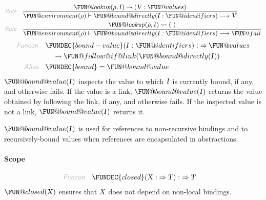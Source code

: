 \begin{align*}
  \KEY{Rule} \quad
    & \frac{
      \FUN@lookup
        (  \VAR{\ensuremath{\rho}}, 
               \VAR{I} ) \leadsto 
        (  \VAR{V} : \FUN@values )
      }{
      \FUN@environment (  \VAR{\ensuremath{\rho}} ) \vdash \FUN@bound@directly
                    (  \VAR{I} : \FUN@identifiers ) \TRANS 
        \VAR{V}
      }
\\
  \KEY{Rule} \quad
    & \frac{
      \FUN@lookup
        (  \VAR{\ensuremath{\rho}}, 
               \VAR{I} ) \leadsto 
        (   \  )
      }{
      \FUN@environment (  \VAR{\ensuremath{\rho}} ) \vdash \FUN@bound@directly
                    (  \VAR{I} : \FUN@identifiers ) \TRANS 
        \FUN@fail
      }
\end{align*}
\begin{align*}
  \KEY{Funcon} \quad
  & \FUNDEC{bound-value}(
                     \VAR{I} : \FUN@identifiers) 
    :  \TO \FUN@values \\&\quad
    \leadsto \FUN@follow@if@link
               (  \FUN@bound@directly
                       (  \VAR{I} ) )
\\
  \KEY{Alias} \quad
  & \FUNDEC{bound} = \FUN@bound@value
\end{align*}
$\FUN@bound@value
    (  \VAR{I} )$ inspects the value to which $\VAR{I}$ is currently bound, if any,
   and otherwise fails. If the value is a link, $\FUN@bound@value
    (  \VAR{I} )$ returns the
   value obtained by following the link, if any, and otherwise fails. If the 
   inspected value is not a link, $\FUN@bound@value
    (  \VAR{I} )$ returns it.

$\FUN@bound@value
    (  \VAR{I} )$ is used for references to non-recursive bindings and to
   recursively-bound values when references are encapsulated in abstractions.

\paragraph{Scope}\hypertarget{scope}{}\label{scope}

\begin{align*}
  \KEY{Funcon} \quad
  & \FUNDEC{closed}(
                     \VAR{X} :  \TO \VAR{T}) 
    :  \TO \VAR{T} 
\end{align*}
$\FUN@closed
    (  \VAR{X} )$ ensures that $\VAR{X}$ does not depend on non-local bindings.

